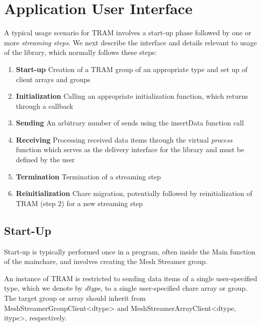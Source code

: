 \section{Application User Interface}

A typical usage scenario for TRAM involves a start-up phase
followed by one or more \emph{streaming steps}. We next describe the
interface and details relevant to usage of the library, which normally
follows these steps:

\begin{enumerate}
\item{\textbf{Start-up}} Creation of a TRAM group of an
  appropriate type and set up of client arrays and groups
\item{\textbf{Initialization}} Calling an appropriate initialization
  function, which returns through a callback
\item{\textbf{Sending}} An arbitrary number of sends using the
  insertData function call
\item{\textbf{Receiving}} Processing received data items through the
  virtual \emph{process} function which serves as the delivery
  interface for the library and must be defined by the user
\item{\textbf{Termination}} Termination of a streaming step
\item{\textbf{Reinitialization}} Chare migration, potentially followed
  by reinitialization of TRAM (step 2) for a new streaming step
\end{enumerate}

\subsection{Start-Up}

Start-up is typically performed once in a program, often inside the
Main function of the mainchare, and involves creating the Mesh
Streamer group.

An instance of TRAM is restricted to sending data items of a
single user-specified type, which we denote by \emph{dtype}, to a
single user-specified chare array or group. The target group or array
should inherit from MeshStreamerGroupClient\textless{}dtype\textgreater{} and
MeshStreamerArrayClient\textless{}dtype, itype\textgreater{}, respectively.



